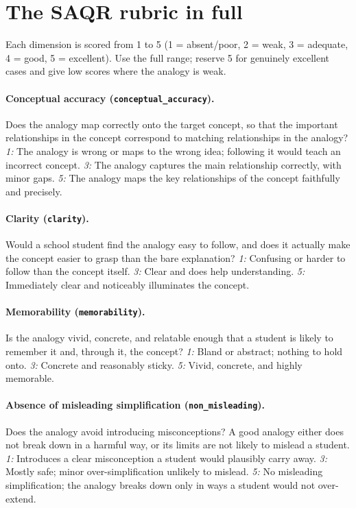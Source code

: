 \section{The SAQR rubric in full}\label{app:rubric}
Each dimension is scored from 1 to 5 (1 = absent/poor, 2 = weak, 3 = adequate, 4 = good, 5 = excellent). Use the full range; reserve 5 for genuinely excellent cases and give low scores where the analogy is weak.

\paragraph{Conceptual accuracy (\texttt{conceptual\_accuracy}).} Does the analogy map correctly onto the target concept, so that the important relationships in the concept correspond to matching relationships in the analogy?
\emph{1:} The analogy is wrong or maps to the wrong idea; following it would teach an incorrect concept. \quad \emph{3:} The analogy captures the main relationship correctly, with minor gaps. \quad \emph{5:} The analogy maps the key relationships of the concept faithfully and precisely.

\paragraph{Clarity (\texttt{clarity}).} Would a school student find the analogy easy to follow, and does it actually make the concept easier to grasp than the bare explanation?
\emph{1:} Confusing or harder to follow than the concept itself. \quad \emph{3:} Clear and does help understanding. \quad \emph{5:} Immediately clear and noticeably illuminates the concept.

\paragraph{Memorability (\texttt{memorability}).} Is the analogy vivid, concrete, and relatable enough that a student is likely to remember it and, through it, the concept?
\emph{1:} Bland or abstract; nothing to hold onto. \quad \emph{3:} Concrete and reasonably sticky. \quad \emph{5:} Vivid, concrete, and highly memorable.

\paragraph{Absence of misleading simplification (\texttt{non\_misleading}).} Does the analogy avoid introducing misconceptions? A good analogy either does not break down in a harmful way, or its limits are not likely to mislead a student.
\emph{1:} Introduces a clear misconception a student would plausibly carry away. \quad \emph{3:} Mostly safe; minor over-simplification unlikely to mislead. \quad \emph{5:} No misleading simplification; the analogy breaks down only in ways a student would not over-extend.

